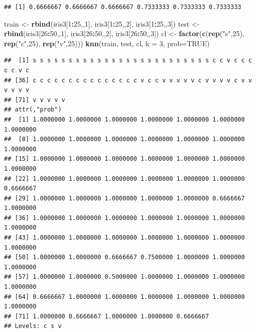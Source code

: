 \documentclass[]{article}
\newenvironment{Shaded}{\begin{snugshade}}{\end{snugshade}}
\newcommand{\KeywordTok}[1]{\textcolor[rgb]{0.13,0.29,0.53}{\textbf{#1}}}
\newcommand{\DataTypeTok}[1]{\textcolor[rgb]{0.13,0.29,0.53}{#1}}
\newcommand{\DecValTok}[1]{\textcolor[rgb]{0.00,0.00,0.81}{#1}}
\newcommand{\StringTok}[1]{\textcolor[rgb]{0.31,0.60,0.02}{#1}}
\newcommand{\OtherTok}[1]{\textcolor[rgb]{0.56,0.35,0.01}{#1}}
\newcommand{\OperatorTok}[1]{\textcolor[rgb]{0.81,0.36,0.00}{\textbf{#1}}}
\newcommand{\NormalTok}[1]{#1}
\begin{document}
\begin{verbatim}
## [1] 0.6666667 0.6666667 0.6666667 0.7333333 0.7333333 0.7333333
\end{verbatim}

\begin{Shaded}
\begin{Highlighting}[]
\NormalTok{train <-}\StringTok{ }\KeywordTok{rbind}\NormalTok{(iris3[}\DecValTok{1}\OperatorTok{:}\DecValTok{25}\NormalTok{,,}\DecValTok{1}\NormalTok{], iris3[}\DecValTok{1}\OperatorTok{:}\DecValTok{25}\NormalTok{,,}\DecValTok{2}\NormalTok{], iris3[}\DecValTok{1}\OperatorTok{:}\DecValTok{25}\NormalTok{,,}\DecValTok{3}\NormalTok{])}
\NormalTok{test <-}\StringTok{ }\KeywordTok{rbind}\NormalTok{(iris3[}\DecValTok{26}\OperatorTok{:}\DecValTok{50}\NormalTok{,,}\DecValTok{1}\NormalTok{], iris3[}\DecValTok{26}\OperatorTok{:}\DecValTok{50}\NormalTok{,,}\DecValTok{2}\NormalTok{], iris3[}\DecValTok{26}\OperatorTok{:}\DecValTok{50}\NormalTok{,,}\DecValTok{3}\NormalTok{])}
\NormalTok{cl <-}\StringTok{ }\KeywordTok{factor}\NormalTok{(}\KeywordTok{c}\NormalTok{(}\KeywordTok{rep}\NormalTok{(}\StringTok{"s"}\NormalTok{,}\DecValTok{25}\NormalTok{), }\KeywordTok{rep}\NormalTok{(}\StringTok{"c"}\NormalTok{,}\DecValTok{25}\NormalTok{), }\KeywordTok{rep}\NormalTok{(}\StringTok{"v"}\NormalTok{,}\DecValTok{25}\NormalTok{)))}
\KeywordTok{knn}\NormalTok{(train, test, cl, }\DataTypeTok{k =} \DecValTok{3}\NormalTok{, }\DataTypeTok{prob=}\OtherTok{TRUE}\NormalTok{)}
\end{Highlighting}
\end{Shaded}

\begin{verbatim}
##  [1] s s s s s s s s s s s s s s s s s s s s s s s s s c c v c c c c c v c
## [36] c c c c c c c c c c c c c c c v c c v v v v v c v v v v c v v v v v v
## [71] v v v v v
## attr(,"prob")
##  [1] 1.0000000 1.0000000 1.0000000 1.0000000 1.0000000 1.0000000 1.0000000
##  [8] 1.0000000 1.0000000 1.0000000 1.0000000 1.0000000 1.0000000 1.0000000
## [15] 1.0000000 1.0000000 1.0000000 1.0000000 1.0000000 1.0000000 1.0000000
## [22] 1.0000000 1.0000000 1.0000000 1.0000000 1.0000000 1.0000000 0.6666667
## [29] 1.0000000 1.0000000 1.0000000 1.0000000 1.0000000 0.6666667 1.0000000
## [36] 1.0000000 1.0000000 1.0000000 1.0000000 1.0000000 1.0000000 1.0000000
## [43] 1.0000000 1.0000000 1.0000000 1.0000000 1.0000000 1.0000000 1.0000000
## [50] 1.0000000 1.0000000 0.6666667 0.7500000 1.0000000 1.0000000 1.0000000
## [57] 1.0000000 1.0000000 0.5000000 1.0000000 1.0000000 1.0000000 1.0000000
## [64] 0.6666667 1.0000000 1.0000000 1.0000000 1.0000000 1.0000000 1.0000000
## [71] 1.0000000 0.6666667 1.0000000 1.0000000 0.6666667
## Levels: c s v
\end{verbatim}
\end{document}
